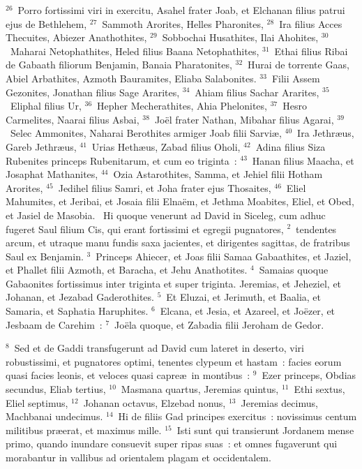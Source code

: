 ${}^{26}$~Porro fortissimi viri in exercitu, Asahel frater Joab, et Elchanan filius patrui ejus de Bethlehem,
${}^{27}$~Sammoth Arorites, Helles Pharonites,
${}^{28}$~Ira filius Acces Thecuites, Abiezer Anathothites,
${}^{29}$~Sobbochai Husathites, Ilai Ahohites,
${}^{30}$~Maharai Netophathites, Heled filius Baana Netophathites,
${}^{31}$~Ethai filius Ribai de Gabaath filiorum Benjamin, Banaia Pharatonites,
${}^{32}$~Hurai de torrente Gaas, Abiel Arbathites, Azmoth Bauramites, Eliaba Salabonites.
${}^{33}$~Filii Assem Gezonites, Jonathan filius Sage Ararites,
${}^{34}$~Ahiam filius Sachar Ararites,
${}^{35}$~Eliphal filius Ur,
${}^{36}$~Hepher Mecherathites, Ahia Phelonites,
${}^{37}$~Hesro Carmelites, Naarai filius Asbai,
${}^{38}$~Jo\"el frater Nathan, Mibahar filius Agarai,
${}^{39}$~Selec Ammonites, Naharai Berothites armiger Joab filii Sarvi\ae ,
${}^{40}$~Ira Jethr\ae us, Gareb Jethr\ae us,
${}^{41}$~Urias Heth\ae us, Zabad filius Oholi,
${}^{42}$~Adina filius Siza Rubenites princeps Rubenitarum, et cum eo triginta~:
${}^{43}$~Hanan filius Maacha, et Josaphat Mathanites,
${}^{44}$~Ozia Astarothites, Samma, et Jehiel filii Hotham Arorites,
${}^{45}$~Jedihel filius Samri, et Joha frater ejus Thosaites,
${}^{46}$~Eliel Mahumites, et Jeribai, et Josaia filii Elna\"em, et Jethma Moabites, Eliel, et Obed, et Jasiel de Masobia.
~Hi quoque venerunt ad David in Siceleg, cum adhuc fugeret Saul filium Cis, qui erant fortissimi et egregii pugnatores,
${}^{2}$~tendentes arcum, et utraque manu fundis saxa jacientes, et dirigentes sagittas, de fratribus Saul ex Benjamin.
${}^{3}$~Princeps Ahiecer, et Joas filii Samaa Gabaathites, et Jaziel, et Phallet filii Azmoth, et Baracha, et Jehu Anathotites.
${}^{4}$~Samaias quoque Gabaonites fortissimus inter triginta et super triginta. Jeremias, et Jeheziel, et Johanan, et Jezabad Gaderothites.
${}^{5}$~Et Eluzai, et Jerimuth, et Baalia, et Samaria, et Saphatia Haruphites.
${}^{6}$~Elcana, et Jesia, et Azareel, et Jo\"ezer, et Jesbaam de Carehim~:
${}^{7}$~Jo\"ela quoque, et Zabadia filii Jeroham de Gedor.


${}^{8}$~Sed et de Gaddi transfugerunt ad David cum lateret in deserto, viri robustissimi, et pugnatores optimi, tenentes clypeum et hastam~: facies eorum quasi facies leonis, et veloces quasi capre\ae\ in montibus~:
${}^{9}$~Ezer princeps, Obdias secundus, Eliab tertius,
${}^{10}$~Masmana quartus, Jeremias quintus,
${}^{11}$~Ethi sextus, Eliel septimus,
${}^{12}$~Johanan octavus, Elzebad nonus,
${}^{13}$~Jeremias decimus, Machbanai undecimus.
${}^{14}$~Hi de filiis Gad principes exercitus~: novissimus centum militibus pr\ae erat, et maximus mille.
${}^{15}$~Isti sunt qui transierunt Jordanem mense primo, quando inundare consuevit super ripas suas~: et omnes fugaverunt qui morabantur in vallibus ad orientalem plagam et occidentalem.



